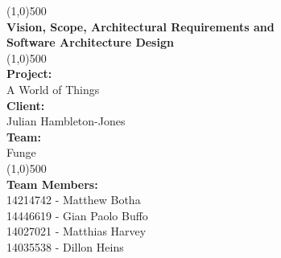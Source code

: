 \documentclass{article}
\begin{document}
\begin{titlepage}
	\begin{center}
		\line(1,0){500}\\
		[6mm]
		\huge{\bfseries Vision, Scope, Architectural Requirements and\\Software Architecture Design}\\
		\line(1,0){500}\\
		[5mm]
		\large\textbf{Project:}\\A World of Things\\
		[3mm]
		\large\textbf{Client:}\\Julian Hambleton-Jones\\
		[3mm]
		\large \textbf{Team:}\\Funge\\
		\line(1,0){500}\\
		[5mm]
		\large \textbf{Team Members:}\\
		[3mm]
		\large 14214742 - Matthew Botha\\
		\large 14446619 - Gian Paolo Buffo\\
		\large 14027021 - Matthias Harvey\\
        \large 14035538 - Dillon Heins\\[3mm]
	\end{center}
\end{titlepage}

\cleardoublepage
\thispagestyle{empty}
\tableofcontents
\cleardoublepage
\setcounter{page}{1}
\end{document}
